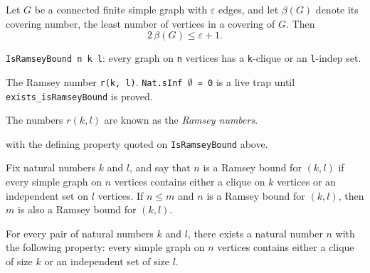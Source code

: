 \begin{theorem}
\label{SimpleGraph.two_mul_coveringNumber_le}
Let $G$ be a connected finite simple graph with $\varepsilon$ edges, and let $\beta(G)$
denote its covering number, the least number of vertices in a covering of $G$. Then \[
2\,\beta(G) \le \varepsilon + 1. \]
\end{theorem}

\begin{definition}
\label{SimpleGraph.IsRamseyBound}
\leanok
\texttt{IsRamseyBound n k l}: every graph on \texttt{n} vertices has a \texttt{k}-clique or an \texttt{l}-indep set.
\end{definition}

\begin{definition}
\label{SimpleGraph.ramseyNumber}
\leanok
{}
The Ramsey number \texttt{r(k, l)}. \texttt{Nat.sInf $\emptyset$ = 0} is a live trap
until \texttt{exists\_isRamseyBound} is proved.

The numbers $r(k, l)$ are known as the \emph{Ramsey numbers}.

with the defining property quoted on \texttt{IsRamseyBound} above.
\end{definition}

\begin{theorem}
\label{SimpleGraph.isRamseyBound_mono}
Fix natural numbers $k$ and $l$, and say that $n$ is a Ramsey bound for $(k,l)$ if every
simple graph on $n$ vertices contains either a clique on $k$ vertices or an independent
set on $l$ vertices. If $n \le m$ and $n$ is a Ramsey bound for $(k,l)$, then $m$ is
also a Ramsey bound for $(k,l)$.
\end{theorem}

\begin{theorem}
\label{SimpleGraph.exists_isRamseyBound}
For every pair of natural numbers $k$ and $l$, there exists a natural number $n$ with
the following property: every simple graph on $n$ vertices contains either a clique of
size $k$ or an independent set of size $l$.
\end{theorem}

